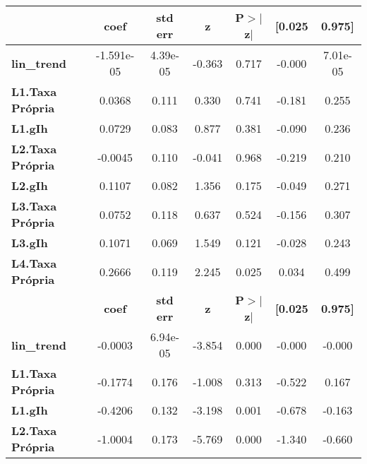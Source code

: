 \begin{center}
\begin{tabular}{lcccccc}
\toprule
                         & \textbf{coef} & \textbf{std err} & \textbf{z} & \textbf{P$> |$z$|$} & \textbf{[0.025} & \textbf{0.975]}  \\
\midrule
\textbf{lin\_trend}      &   -1.591e-05  &     4.39e-05     &    -0.363  &         0.717        &       -0.000    &     7.01e-05     \\
\textbf{L1.Taxa Própria} &       0.0368  &        0.111     &     0.330  &         0.741        &       -0.181    &        0.255     \\
\textbf{L1.gIh}          &       0.0729  &        0.083     &     0.877  &         0.381        &       -0.090    &        0.236     \\
\textbf{L2.Taxa Própria} &      -0.0045  &        0.110     &    -0.041  &         0.968        &       -0.219    &        0.210     \\
\textbf{L2.gIh}          &       0.1107  &        0.082     &     1.356  &         0.175        &       -0.049    &        0.271     \\
\textbf{L3.Taxa Própria} &       0.0752  &        0.118     &     0.637  &         0.524        &       -0.156    &        0.307     \\
\textbf{L3.gIh}          &       0.1071  &        0.069     &     1.549  &         0.121        &       -0.028    &        0.243     \\
\textbf{L4.Taxa Própria} &       0.2666  &        0.119     &     2.245  &         0.025        &        0.034    &        0.499     \\
                         & \textbf{coef} & \textbf{std err} & \textbf{z} & \textbf{P$> |$z$|$} & \textbf{[0.025} & \textbf{0.975]}  \\
\midrule
\textbf{lin\_trend}      &      -0.0003  &     6.94e-05     &    -3.854  &         0.000        &       -0.000    &       -0.000     \\
\textbf{L1.Taxa Própria} &      -0.1774  &        0.176     &    -1.008  &         0.313        &       -0.522    &        0.167     \\
\textbf{L1.gIh}          &      -0.4206  &        0.132     &    -3.198  &         0.001        &       -0.678    &       -0.163     \\
\textbf{L2.Taxa Própria} &      -1.0004  &        0.173     &    -5.769  &         0.000        &       -1.340    &       -0.660     \\

\end{tabular}
\end{center}
